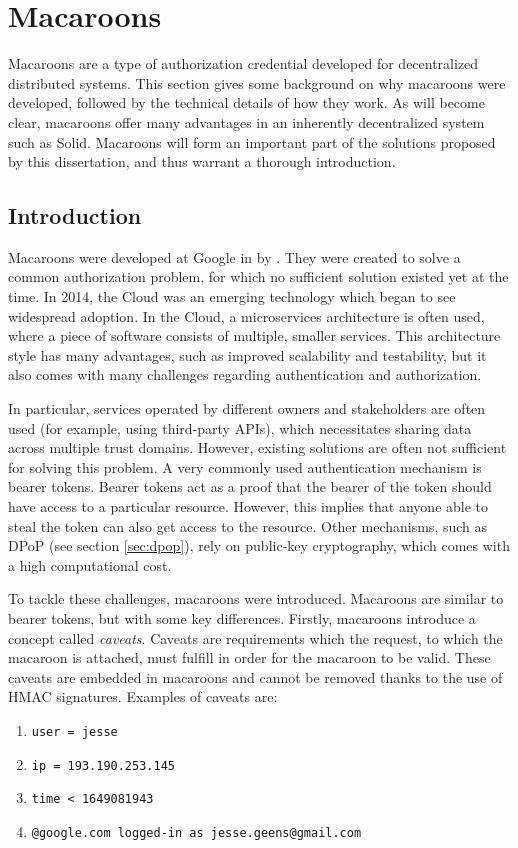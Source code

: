 \section{Macaroons}
\label{sec:macaroons}
Macaroons are a type of authorization credential developed for decentralized distributed systems. This section gives some background on why macaroons were developed, followed by the technical details of how they work. As will become clear, macaroons offer many advantages in an inherently decentralized system such as Solid. Macaroons will form an important part of the solutions proposed by this dissertation, and thus warrant a thorough introduction.

\subsection{Introduction}
\label{sec:macaroons-intro}
Macaroons were developed at Google in \citeyear{macaroons} by \citeauthor{macaroons}. They were created to solve a common authorization problem, for which no sufficient solution existed yet at the time. In 2014, the Cloud was an emerging technology which began to see widespread adoption. In the Cloud, a microservices architecture is often used, where a piece of software consists of multiple, smaller services. This architecture style has many advantages, such as improved scalability and testability, but it also comes with many challenges regarding authentication and authorization.

\noindent In particular, services operated by different owners and stakeholders are often used (for example, using third-party APIs), which necessitates sharing data across multiple trust domains. However, existing solutions are often not sufficient for solving this problem. A very commonly used authentication mechanism is bearer tokens. Bearer tokens act as a proof that the bearer of the token should have access to a particular resource. However, this implies that anyone able to steal the token can also get access to the resource. Other mechanisms, such as DPoP (see section \ref{sec:dpop}), rely on public-key cryptography, which comes with a high computational cost.

To tackle these challenges, macaroons were introduced. Macaroons are similar to bearer tokens, but with some key differences. Firstly, macaroons introduce a concept called \textit{caveats}. Caveats are requirements which the request, to which the macaroon is attached, must fulfill in order for the macaroon to be valid. These caveats are embedded in macaroons and cannot be removed thanks to the use of \acrshort{HMAC} signatures. Examples of caveats are:
\begin{enumerate}
    \itemsep0.1em 
    \item \texttt{user = jesse}
    \item \texttt{ip = 193.190.253.145}
    \item \texttt{time < 1649081943}
    \item \texttt{@google.com logged-in as jesse.geens@gmail.com}
\end{enumerate}

